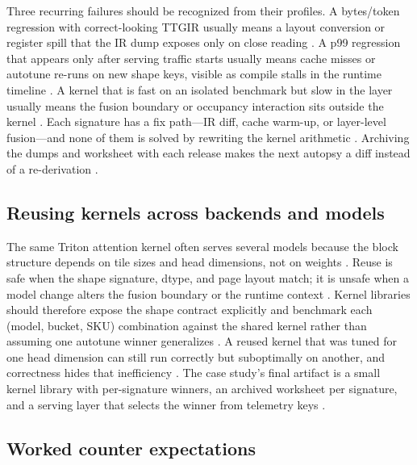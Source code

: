 Three recurring failures should be recognized from their profiles. A bytes/token regression with correct-looking TTGIR usually means a layout conversion or register spill that the IR dump exposes only on close reading \citep{tritonlang2024,memoryfloor2026}. A p99 regression that appears only after serving traffic starts usually means cache misses or autotune re-runs on new shape keys, visible as compile stalls in the runtime timeline \citep{patel2025llminference,kwon2023vllm}. A kernel that is fast on an isolated benchmark but slow in the layer usually means the fusion boundary or occupancy interaction sits outside the kernel \citep{taxbreak2026,memoryfloor2026}. Each signature has a fix path---IR diff, cache warm-up, or layer-level fusion---and none of them is solved by rewriting the kernel arithmetic \citep{chen2020compilerbasedhardw,patel2025llminference}. Archiving the dumps and worksheet with each release makes the next autopsy a diff instead of a re-derivation \citep{memoryfloor2026,taxbreak2026}.

\subsection{Reusing kernels across backends and models}

The same Triton attention kernel often serves several models because the block structure depends on tile sizes and head dimensions, not on weights \citep{dao2022flashattention,tritonlang2024}. Reuse is safe when the shape signature, dtype, and page layout match; it is unsafe when a model change alters the fusion boundary or the runtime context \citep{patel2025llminference,memoryfloor2026}. Kernel libraries should therefore expose the shape contract explicitly and benchmark each (model, bucket, SKU) combination against the shared kernel rather than assuming one autotune winner generalizes \citep{taxbreak2026,chen2020compilerbasedhardw}. A reused kernel that was tuned for one head dimension can still run correctly but suboptimally on another, and correctness hides that inefficiency \citep{tritonlang2024,patel2025llminference}. The case study's final artifact is a small kernel library with per-signature winners, an archived worksheet per signature, and a serving layer that selects the winner from telemetry keys \citep{memoryfloor2026,chen2020compilerbasedhardw}.

\subsection{Worked counter expectations}

